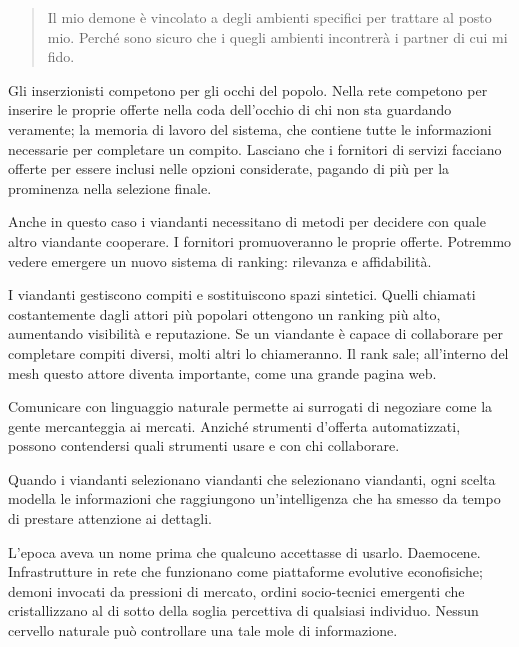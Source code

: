 \begin{quote}
Il mio demone è vincolato a degli ambienti specifici per trattare al posto mio. Perché sono sicuro che i quegli ambienti incontrerà i partner di cui mi fido.
\end{quote}

Gli inserzionisti competono per gli occhi del popolo. Nella rete competono per inserire le proprie offerte nella coda dell'occhio di chi non sta guardando veramente; la memoria di lavoro del sistema, che contiene tutte le informazioni necessarie per completare un compito. Lasciano che i fornitori di servizi facciano offerte per essere inclusi nelle opzioni considerate, pagando di più per la prominenza nella selezione finale.


Anche in questo caso i viandanti necessitano di metodi per decidere con quale altro viandante cooperare. I fornitori promuoveranno le proprie offerte. Potremmo vedere emergere un nuovo sistema di ranking: rilevanza e affidabilità.

I viandanti gestiscono compiti e sostituiscono spazi sintetici. Quelli chiamati costantemente dagli attori più popolari ottengono un ranking più alto, aumentando visibilità e reputazione. Se un viandante è capace di collaborare per completare compiti diversi, molti altri lo chiameranno. Il rank sale; all'interno del mesh questo attore diventa importante, come una grande pagina web.

Comunicare con linguaggio naturale permette ai surrogati di negoziare come la gente mercanteggia ai mercati. Anziché strumenti d'offerta automatizzati, possono contendersi quali strumenti usare e con chi collaborare.

Quando i viandanti selezionano viandanti che selezionano viandanti, ogni scelta modella le informazioni che raggiungono un'intelligenza che ha smesso da tempo di prestare attenzione ai dettagli.

L'epoca aveva un nome prima che qualcuno accettasse di usarlo. Daemocene. Infrastrutture in rete che funzionano come piattaforme evolutive econofisiche; demoni invocati da pressioni di mercato, ordini socio-tecnici emergenti che cristallizzano al di sotto della soglia percettiva di qualsiasi individuo. Nessun cervello naturale può controllare una tale mole di informazione.

